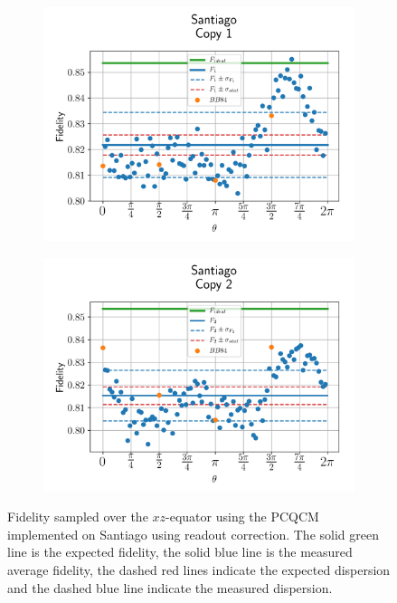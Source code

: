   
  \begin{figure}[H]
    \centering
    \begin{subfigure}{.5\textwidth}
      \centering
      \includegraphics[width=\textwidth]{Figures/PhaseCovariant/IBM/OnlyEquator/results_santiago_copy1.png}
      \label{fig:pc_uncorrected_santiago_equator_1}
    \end{subfigure}%
    \begin{subfigure}{.5\textwidth}
      \centering
      \includegraphics[width=\textwidth]{Figures/PhaseCovariant/IBM/OnlyEquator/results_santiago_copy2.png}
      \label{fig:pc_uncorrected_santiago_equator_2}
    \end{subfigure}
    \vspace{-0.5cm}
    \caption{Fidelity sampled over the $xz$-equator using the PCQCM implemented on Santiago using readout correction. The solid green line is the expected fidelity, the solid blue line is the measured average fidelity, the dashed red lines indicate the expected dispersion and the dashed blue line indicate the measured dispersion.}
    \label{fig:pc_uncorrected_santiago_equator}
  \end{figure}
  

